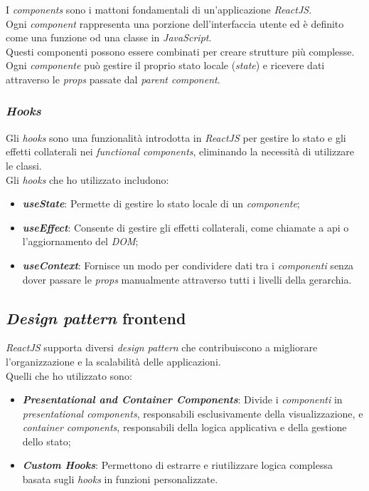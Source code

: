 I \textit{components} sono i mattoni fondamentali di un'applicazione \textit{ReactJS}.\\
Ogni \textit{component} rappresenta una porzione dell'interfaccia utente ed è definito come una funzione od una classe in \textit{JavaScript}.\\
Questi componenti possono essere combinati per creare strutture più complesse.\\
Ogni \textit{componente} può gestire il proprio stato locale (\textit{state}) e ricevere dati attraverso le \textit{props} passate dal \textit{parent component}. \\

\subsubsection{\textit{Hooks}}

Gli \textit{hooks} sono una funzionalità introdotta in \textit{ReactJS} per gestire lo stato e gli effetti collaterali nei \textit{functional components}, eliminando la necessità di utilizzare le classi.\\

\noindent Gli \textit{hooks} che ho utilizzato includono:
\begin{itemize}
    \item \textbf{\textit{useState}}: Permette di gestire lo stato locale di un \textit{componente};
    \item \textbf{\textit{useEffect}}: Consente di gestire gli effetti collaterali, come chiamate a \gls{api} o l'aggiornamento del \textit{DOM};
    \item \textbf{\textit{useContext}}: Fornisce un modo per condividere dati tra i \textit{componenti} senza dover passare le \textit{props} manualmente attraverso tutti i livelli della gerarchia.
\end{itemize}

\subsection*{\textit{Design pattern} \gls{frontend}}

\textit{ReactJS} supporta diversi \textit{design pattern} che contribuiscono a migliorare l'organizzazione e la scalabilità delle applicazioni. \\
Quelli che ho utilizzato sono:
\begin{itemize}
    \item \textbf{\textit{Presentational and Container Components}}: Divide i \textit{componenti} in \textit{presentational components}, responsabili esclusivamente della visualizzazione, e \textit{container components}, responsabili della logica applicativa e della gestione dello stato;
    \item \textbf{\textit{Custom Hooks}}: Permettono di estrarre e riutilizzare logica complessa basata sugli \textit{hooks} in funzioni personalizzate.
\end{itemize}



